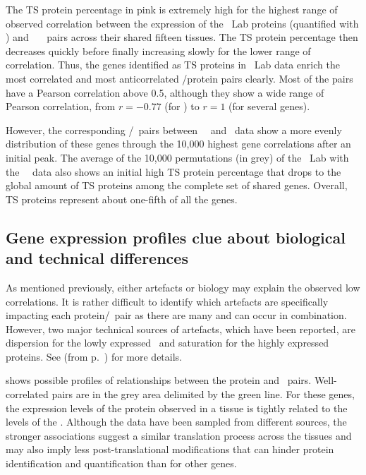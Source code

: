 The \gls{TS} protein percentage in pink is extremely high
for the highest range of observed correlation between the expression of
the \pandey\ Lab proteins (quantified with \PPKM) and
\uhlen\ \etal\ \mRNAs\ pairs
across their shared fifteen tissues.
The \gls{TS} protein percentage then decreases quickly
before finally increasing slowly for the lower range of correlation.
Thus, the genes identified as \gls{TS} proteins in \pandey\ Lab data enrich
the most correlated and most anticorrelated \mRNA/protein pairs clearly.
Most of the pairs have a Pearson correlation above 0.5,
although they show a wide range of Pearson correlation,
from $r= -0.77$ (for ) to $r=1$ (for several genes).\mybr\

However,
the corresponding \mRNA/\mRNA\ pairs between \uhlen\ \etal\ and \gtex\ data
show a more evenly distribution of these genes
through the 10,000 highest gene correlations after an initial peak.
The average of the 10,000 permutations (in grey) of the \pandey\ Lab
with the \uhlen\ \etal\ data also shows
an initial high \gls{TS} protein percentage that drops
to the global amount of \gls{TS} proteins among the complete set of shared genes.
Overall, \gls{TS} proteins represent about one-fifth of all the genes.\mybr\

\subsection{Gene expression profiles clue about biological and technical differences\quad}
\vspace{-6mm}
As mentioned previously,
either artefacts or biology may explain the observed low correlations.
It is rather difficult to identify
which artefacts are specifically impacting each protein/\mRNA\ pair
as there are many and can occur in combination.
However, two major technical sources of artefacts,
which have been reported,
are dispersion for the lowly expressed \mRNAs\ and
saturation for the highly expressed proteins.
See  (from p.~\pageref{sec:transExplo})
for more details.\mybr\

 shows possible profiles of relationships
between the protein and \mRNA\ pairs.
Well-correlated pairs are in the grey area delimited by the green line.
For these genes, the expression levels of the protein observed in a tissue is
tightly related to the levels of the \mRNA{}.
Although the data have been sampled from different sources,
the stronger associations suggest a similar translation process across the tissues
and may also imply less post-translational modifications
that can hinder protein identification and quantification than for other genes.\mybr\

